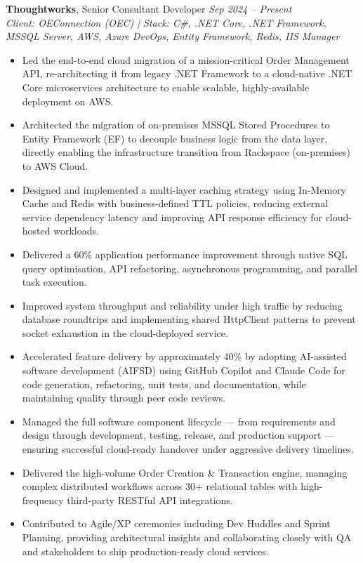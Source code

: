 \documentclass[a4paper,10pt]{article}
\begin{document}
\textbf{Thoughtworks}, Senior Consultant Developer \hfill \textit{Sep 2024 -- Present}\\
\textit{Client: OEConnection (OEC) | Stack: C\#, .NET Core, .NET Framework, MSSQL Server, AWS, Azure DevOps, Entity Framework, Redis, IIS Manager}
\begin{itemize}[leftmargin=1.5em, itemsep=0.01em]
  \item Led the end-to-end cloud migration of a mission-critical Order Management API, re-architecting it from legacy .NET Framework to a cloud-native .NET Core microservices architecture to enable scalable, highly-available deployment on AWS.
  \item Architected the migration of on-premises MSSQL Stored Procedures to Entity Framework (EF) to decouple business logic from the data layer, directly enabling the infrastructure transition from Rackspace (on-premises) to AWS Cloud.
  \item Designed and implemented a multi-layer caching strategy using In-Memory Cache and Redis with business-defined TTL policies, reducing external service dependency latency and improving API response efficiency for cloud-hosted workloads.
  \item Delivered a 60\% application performance improvement through native SQL query optimisation, API refactoring, asynchronous programming, and parallel task execution.
  \item Improved system throughput and reliability under high traffic by reducing database roundtrips and implementing shared HttpClient patterns to prevent socket exhaustion in the cloud-deployed service.
  \item Accelerated feature delivery by approximately 40\% by adopting AI-assisted software development (AIFSD) using GitHub Copilot and Claude Code for code generation, refactoring, unit tests, and documentation, while maintaining quality through peer code reviews.
  \item Managed the full software component lifecycle — from requirements and design through development, testing, release, and production support — ensuring successful cloud-ready handover under aggressive delivery timelines.
  \item Delivered the high-volume Order Creation \& Transaction engine, managing complex distributed workflows across 30+ relational tables with high-frequency third-party RESTful API integrations.
  \item Contributed to Agile/XP ceremonies including Dev Huddles and Sprint Planning, providing architectural insights and collaborating closely with QA and stakeholders to ship production-ready cloud services.
\end{itemize}
\end{document}
